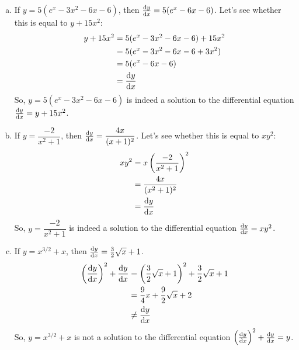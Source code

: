 \begin{solution}
\begin{enumerate}[(a)]
\item If $y=5(e^x-3x^2-6x-6)$, then $\diff{y}{x} = 5(e^x-6x-6)$. Let's see whether this is equal to $y+15x^2$:
\begin{align*}
y+15x^2&=5(e^x-3x^2-6x-6)+15x^2\\
&=5(e^x-3x^2-6x-6+3x^2)\\
&=5(e^x-6x-6)\\
&=\diff{y}{x}
\end{align*}
So, $y=5(e^x-3x^2-6x-6)$ is indeed a solution to the differential equation $\diff{y}{x}=y+15x^2$.
%
\item If $y=\dfrac{-2}{x^2+1}$, then  $\diff{y}{x} = \dfrac{4x}{(x+1)^2}$. Let's see whether this is equal to $xy^2$:
\begin{align*}
xy^2&=x\left(\frac{-2}{x^2+1}\right)^2\\
&=\frac{4x}{(x^2+1)^2}\\
&=\diff{y}{x}
\end{align*}
So, $y=\dfrac{-2}{x^2+1}$ is indeed a solution to the differential equation $\diff{y}{x}=xy^2$.
%
\item If $y=x^{3/2}+x$, then  $\diff{y}{x} = \frac{3}{2}\sqrt{x}+1$.
\begin{align*}
\left(\diff{y}{x}\right)^2+\diff{y}{x}&=\left(\frac{3}{2}\sqrt{x}+1\right)^2+\frac{3}{2}\sqrt{x}+1\\
&=\frac{9}{4}x+\frac{9}{2}\sqrt{x}+2\\
&\neq \diff{y}{x}
\end{align*}
So, $y=x^{3/2}+x$ is not a solution to the differential equation $\left(\diff{y}{x}\right)^2+\diff{y}{x}=y$.
\end{enumerate}
\end{solution}

